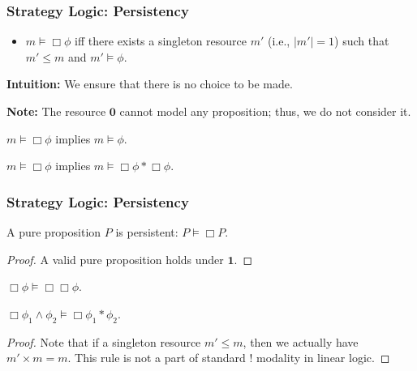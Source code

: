 \begin{frame}[fragile]
    \frametitle{Strategy Logic: Persistency}

\begin{definition}[Persistency]
    \begin{itemize}
        \item $m \models \Box \phi$ iff there exists a singleton resource $m'$ (i.e., $|m'| = 1$) such that $m' \leq m$ and $m' \models \phi$.
    \end{itemize}
\end{definition}

\textbf{Intuition:} We ensure that there is no choice to be made.

\textbf{Note:} The resource $\textbf{0}$ cannot model any proposition; thus, we do not consider it.

\begin{lemma} $m \models \Box \phi$ implies $m \models \phi$.
\end{lemma}

\begin{lemma} $m \models \Box \phi$ implies $m \models \Box \phi * \Box \phi$.
\end{lemma}

\end{frame}

\begin{frame}[fragile]
    \frametitle{Strategy Logic: Persistency}

\begin{lemma} A pure proposition $P$ is persistent: $P \models \Box P$.
\end{lemma}
\begin{proof} A valid pure proposition holds under $\textbf{1}$. 
\end{proof}

\begin{lemma} $\Box \phi \models \Box \Box \phi$.
\end{lemma}

\begin{lemma} $\Box \phi_1 \land \phi_2 \models \Box \phi_1 * \phi_2$.
\end{lemma}
\begin{proof} Note that if a singleton resource $m' \leq m$, then we actually have $m' \times m = m$. This rule is not a part of standard $!$ modality in linear logic.
\end{proof}

\end{frame}


